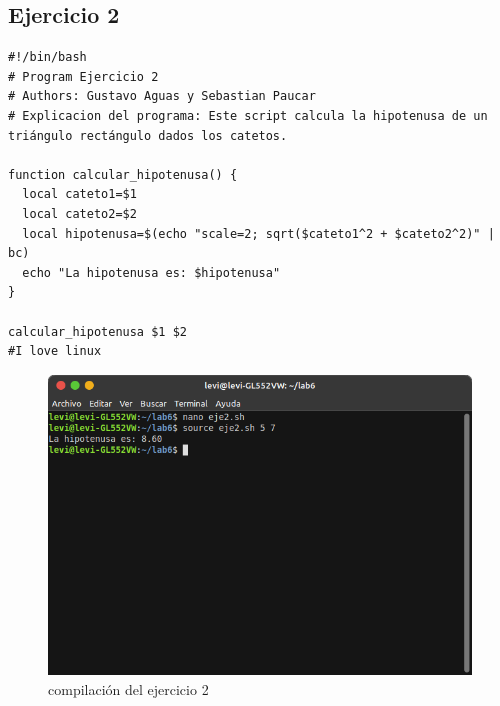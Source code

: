 \documentclass[11pt,twoside]{book}
\begin{document}
\subsection{Ejercicio 2}
\begin{lstlisting}
#!/bin/bash
# Program Ejercicio 2
# Authors: Gustavo Aguas y Sebastian Paucar
# Explicacion del programa: Este script calcula la hipotenusa de un triángulo rectángulo dados los catetos.

function calcular_hipotenusa() {
  local cateto1=$1
  local cateto2=$2
  local hipotenusa=$(echo "scale=2; sqrt($cateto1^2 + $cateto2^2)" | bc)
  echo "La hipotenusa es: $hipotenusa"
}

calcular_hipotenusa $1 $2
#I love linux
\end{lstlisting}
\begin{figure}[h]
    \centering
    \includegraphics[width=0.8\linewidth]{img_tarea6/eje2con.png}
    \caption{ compilación del ejercicio 2}
\end{figure}
\newpage
\end{document}
